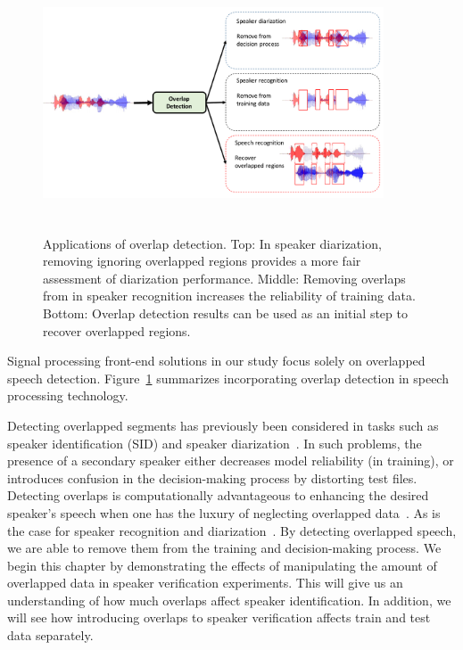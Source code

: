 \begin{figure}[t!]
	\centering
	\vspace{0mm}
	\includegraphics[height = 3in, width=0.9\textwidth]{figures/overlap_detection_applications}
	\vspace{-3mm}
	\caption{Applications of overlap detection. 
	Top: In speaker diarization, removing ignoring overlapped regions provides a more fair assessment of diarization performance. 
	Middle: Removing overlaps from in speaker recognition increases the reliability of training data.
	Bottom: Overlap detection results can be used as an initial step to recover overlapped regions.}
	\label{fig:pykno_blockdiag}
	\vspace{-3mm}
\end{figure}

Signal processing front-end solutions in our study focus solely on overlapped speech detection. 
Figure~\ref{fig:pykno_blockdiag} summarizes incorporating overlap detection in speech processing technology. 


Detecting overlapped segments has previously been considered in tasks such as speaker identification (SID) and speaker diarization~\cite{boakye_thesis,yantorno_report}. 
In such problems, the presence of a secondary speaker either decreases model reliability (in training), or introduces confusion in the decision-making process by distorting test files. 
Detecting overlaps is computationally advantageous to enhancing the desired speaker's speech when one has the luxury of neglecting overlapped data~\cite{yantorno_report}. 
As is the case for speaker recognition and diarization~\cite{Boakye_is_08}. 
By detecting overlapped speech, we are able to remove them from the training and decision-making process. 
We begin this chapter by demonstrating the effects of manipulating the amount of overlapped data in speaker verification experiments. 
This will give us an understanding of how much overlaps affect speaker identification. 
In addition, we will see how introducing overlaps to speaker verification affects train and test data separately. 


